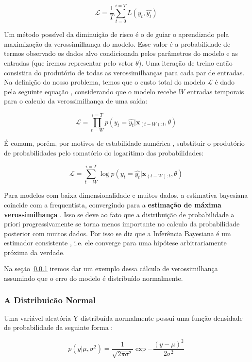 \[
  \mathcal{L} = \frac{1}{T}\sum_{t=0}^{i=T}L(y_t,\hat{y_t}) 
\]

Um método possível da diminuição de risco é o de guiar o aprendizado pela
maximização da verossimilhança do modelo. Esse valor é a probabilidade de termos
observado os dados alvo condicionada pelos parâmetros do modelo e as entradas
(que iremos representar pelo vetor $\theta$). Uma iteração de
treino então consistira do produtório de todas as verossimilhanças para cada par
de entradas. Na definição do nosso problema, temos que o custo total do modelo
$\mathcal{L}$ é dado pela seguinte equação \citep{dlbook}, considerando que o
modelo recebe $W$ entradas temporais para o calculo da verossimilhança de uma saída:

\[
\mathcal{L} = \prod_{t=W}^{i=T} p(y_t=\hat{y_t} | \textbf{x}_{(t-W):t}, \theta) 
\]

É comum, porém, por motivos de estabilidade numérica \citep{dlbook}, substituir
o produtório de probabilidades pelo somatório do logarítimo das probabilidades: 

\[
  \mathcal{L} = \sum_{t=W}^{i=T} \log{p(y_t=\hat{y_t} | \textbf{x}_{(t-W):t},\theta)}
\]

Para modelos com baixa dimensionalidade e muitos dados, a estimativa bayesiana
coincide com a frequentista, convergindo para a \textbf{estimação de máxima
verossimilhança} \citep{mlprob}. Isso se deve ao fato que a distribuição de
probabilidade a priori progressivamente se torna menos importante no calculo da
probabilidade posterior com muitos dados. Por isso se diz que a Inferência
Bayesiana é um estimador consistente \citep{mlprob}, i.e. ele converge para uma
hipótese arbitrariamente próxima da verdade.


Na seção~\ref{sec:reglog} iremos dar um exemplo dessa cálculo de verossimilhança
assumindo que o erro do modelo é distribuído normalmente.

\subsubsection{A Distribuicão Normal}
\label{sec:reglog}

Uma variável aleatória Y distribuída normalmente possui uma função densidade de
probabilidade da seguinte forma \citep{mlprob}:

\begin{equation}
  \label{eq:ver}
p(y| \mu,\sigma^2) = \frac{1}{\sqrt{2\pi\sigma^2}}\exp{-\frac{(y - \mu)^2}{2\sigma^2}}
\end{equation}

